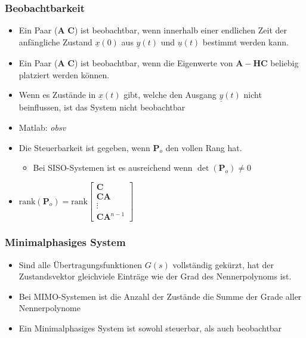 \subsubsection{Beobachtbarkeit}
\label{subsubsec:Beobachtbarkeit}
\begin{itemize}
	\item Ein Paar ($\boldsymbol{A}$ $\boldsymbol{C}$) ist beobachtbar, wenn innerhalb einer endlichen Zeit der anfängliche Zustand $\underline{x}(0)$ aus $\underline{y}(t)$ und $\underline{u}(t)$ bestimmt werden kann.
	\item Ein Paar ($\boldsymbol{A}$ $\boldsymbol{C}$) ist beobachtbar, wenn die Eigenwerte von $\boldsymbol{A}-\boldsymbol{HC}$ beliebig platziert werden können. 
	\item Wenn es Zustände in $\underline{x}(t)$ gibt, welche den Ausgang $\underline{y}(t)$ nicht beinflussen, ist das System nicht beobachtbar
	\item Matlab: \textit{obsv}
	\item Die Steuerbarkeit ist gegeben, wenn $\boldsymbol{P}_o$ den vollen Rang hat.
	\begin{itemize}
		\item Bei SISO-Systemen ist es ausreichend wenn $\det\left( \boldsymbol{P}_o\right) \neq 0$
	\end{itemize}
	\item 	$\text{rank}\left(\boldsymbol{P}_o\right)  = \text{rank}
		\begin{bmatrix}
			\boldsymbol{C} \\
			\boldsymbol{CA} \\
			\vdots\\
			\boldsymbol{C}\boldsymbol{A}^{n-1}
		\end{bmatrix}$
\end{itemize}


\subsubsection{Minimalphasiges System}
\begin{itemize}
	\item Sind alle Übertragungsfunktionen $G(s)$ vollständig gekürzt, hat der Zustandsvektor gleichviele Einträge wie der Grad des Nennerpolynoms ist.
	\item Bei MIMO-Systemen ist die Anzahl der Zustände die Summe der Grade aller Nennerpolynome
	\item Ein Minimalphasiges System ist sowohl steuerbar, als auch beobachtbar
\end{itemize}

